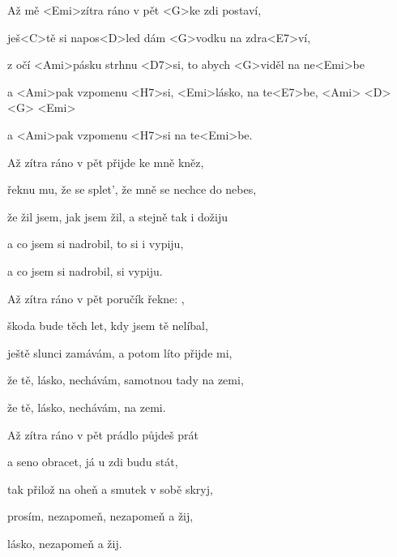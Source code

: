 

\zs
Až mě <Emi>zítra ráno v pět
<G>ke zdi postaví,

ješ<C>tě si napos<D>led
dám <G>vodku na zdra<E7>ví,

z očí <Ami>pásku strhnu <D7>si, to
abych <G>viděl na ne<Emi>be

a <Ami>pak vzpomenu <H7>si,
<Emi>lásko, na te<E7>be,
<Ami> <D> <G> <Emi>

a <Ami>pak vzpomenu <H7>si na te<Emi>be.
\ks

\zs
Až zítra ráno v pět přijde ke mně kněz,

řeknu mu, že se splet', že mně se nechce do nebes,

že žil jsem, jak jsem žil, a stejně tak i dožiju

a co jsem si nadrobil, to si i vypiju,

a co jsem si nadrobil, si vypiju.
\ks

\zs
Až zítra ráno v pět poručík řekne: ,

škoda bude těch let, kdy jsem tě nelíbal,

ještě slunci zamávám, a potom líto přijde mi,

že tě, lásko, nechávám, samotnou tady na zemi,

že tě, lásko, nechávám, na zemi.
\ks

\zs
Až zítra ráno v pět prádlo půjdeš prát

a seno obracet, já u zdi budu stát,

tak přilož na oheň a smutek v sobě skryj,

prosím, nezapomeň, nezapomeň a žij,

lásko, nezapomeň a žij.
\ks

\kp























